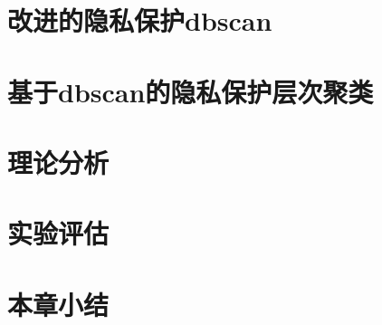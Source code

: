 \section{改进的隐私保护dbscan}
\label{s4-t2}
\section{基于dbscan的隐私保护层次聚类}
\label{s4-t3}
\section{理论分析}
\label{s4-lilun}
\section{实验评估}
\label{s4-shiyan}
\section{本章小结}
\label{s4-xiaojie}
